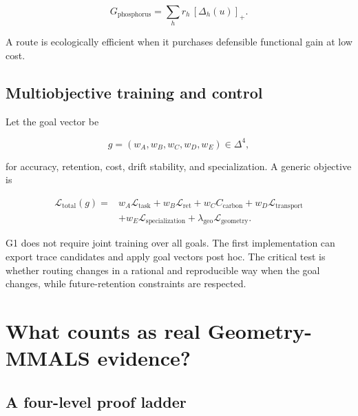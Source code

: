 \documentclass[11pt,a4paper]{article}
\newcommand{\loss}{\mathcal{L}}
\begin{document}
\begin{equation}
 G_{\mathrm{phosphorus}}=\sum_h r_h\,[\Delta_h(u)]_+.
\end{equation}

A route is ecologically efficient when it purchases defensible functional gain at low cost.

\subsection{Multiobjective training and control}

Let the goal vector be

\begin{equation}
 g=(w_A,w_B,w_C,w_D,w_E)\in\Delta^4,
\end{equation}

for accuracy, retention, cost, drift stability, and specialization. A generic objective is

\begin{equation}
\begin{split}
\loss_{\mathrm{total}}(g)=
&w_A\loss_{\mathrm{task}}
+w_B\loss_{\mathrm{ret}}
+w_C C_{\mathrm{carbon}}
+w_D\loss_{\mathrm{transport}}\\
&+w_E\loss_{\mathrm{specialization}}
+\lambda_{\mathrm{geo}}\loss_{\mathrm{geometry}}.
\end{split}
\end{equation}

G1 does not require joint training over all goals. The first implementation can export trace candidates and apply goal vectors post hoc. The critical test is whether routing changes in a rational and reproducible way when the goal changes, while future-retention constraints are respected.

\section{What counts as real Geometry-MMALS evidence?}

\subsection{A four-level proof ladder}
\end{document}
